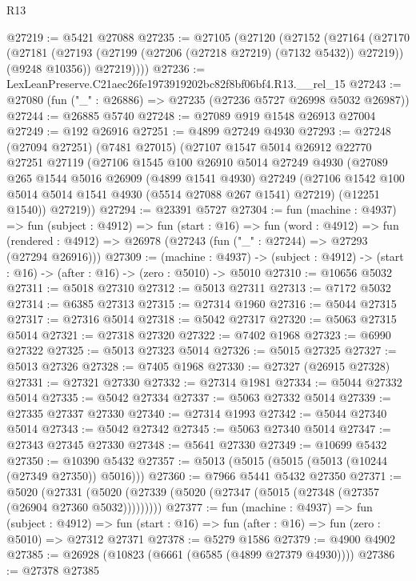 \begin{lexlean}{R13}
\begin{coremodule}
@27219 := @5421 @27088
@27235 := @27105
    (@27120
      (@27152
        (@27164
          (@27170
            (@27181 (@27193 (@27199 (@27206 (@27218 @27219) (@7132 @5432)) @27219)) (@9248 @10356))
            @27219))))
@27236 := LexLeanPreserve.C21aec26fe1973919202bc82f8bf06bf4.R13.__rel_15
@27243 := @27080 (fun ("_" : @26886) => @27235 (@27236 @5727 @26998 @5032 @26987))
@27244 := @26885 @5740
@27248 := @27089 @919 @1548 @26913 @27004
@27249 := @192 @26916
@27251 := @4899 @27249 @4930
@27293 := @27248
    (@27094 @27251)
    (@7481 @27015)
    (@27107
      @1547
      @5014
      @26912
      @22770
      @27251
      @27119
      (@27106
        @1545
        @100
        @26910
        @5014
        @27249
        @4930
        (@27089
          @265
          @1544
          @5016
          @26909
          (@4899 @1541 @4930)
          @27249
          (@27106 @1542 @100 @5014 @5014 @1541 @4930 (@5514 @27088 @267 @1541) @27219)
          (@12251 @1540))
        @27219))
@27294 := @23391 @5727
@27304 := fun (machine : @4937) =>
  fun (subject : @4912) =>
  fun (start : @16) =>
  fun (word : @4912) =>
  fun (rendered : @4912) => @26978 (@27243 (fun ("_" : @27244) => @27293 (@27294 @26916)))
@27309 := (machine : @4937) ->
  (subject : @4912) -> (start : @16) -> (after : @16) -> (zero : @5010) -> @5010
@27310 := @10656 @5032
@27311 := @5018 @27310
@27312 := @5013 @27311
@27313 := @7172 @5032
@27314 := @6385 @27313
@27315 := @27314 @1960
@27316 := @5044 @27315
@27317 := @27316 @5014
@27318 := @5042 @27317
@27320 := @5063 @27315 @5014
@27321 := @27318 @27320
@27322 := @7402 @1968
@27323 := @6990 @27322
@27325 := @5013 @27323 @5014
@27326 := @5015 @27325
@27327 := @5013 @27326
@27328 := @7405 @1968
@27330 := @27327 (@26915 @27328)
@27331 := @27321 @27330
@27332 := @27314 @1981
@27334 := @5044 @27332 @5014
@27335 := @5042 @27334
@27337 := @5063 @27332 @5014
@27339 := @27335 @27337 @27330
@27340 := @27314 @1993
@27342 := @5044 @27340 @5014
@27343 := @5042 @27342
@27345 := @5063 @27340 @5014
@27347 := @27343 @27345 @27330
@27348 := @5641 @27330
@27349 := @10699 @5432
@27350 := @10390 @5432
@27357 := @5013 (@5015 (@5015 (@5013 (@10244 (@27349 @27350)) @5016)))
@27360 := @7966 @5441 @5432 @27350
@27371 := @5020
    (@27331 (@5020 (@27339 (@5020 (@27347 (@5015 (@27348 (@27357 (@26904 @27360 @5032)))))))))
@27377 := fun (machine : @4937) =>
  fun (subject : @4912) =>
  fun (start : @16) => fun (after : @16) => fun (zero : @5010) => @27312 @27371
@27378 := @5279 @1586
@27379 := @4900 @4902
@27385 := @26928 (@10823 (@6661 (@6585 (@4899 @27379 @4930))))
@27386 := @27378 @27385

\end{coremodule}
\end{lexlean}
